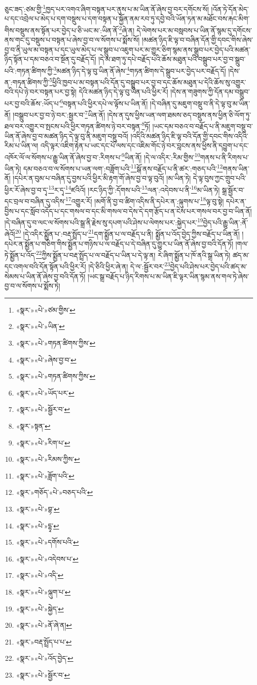 ཅུང་ཟད་:ཙམ་གྱི་\footnote{«སྣར་»«པེ་»ཙམ་གྱིས་}ཁྱད་པར་འགའ་ཞིག་བསྟན་པར་ནུས་པ་མ་ཡིན་ནོ་ཞེས་བྱ་བར་དགོངས་སོ། །འོན་ཏེ་དོན་མེད་པ་དང་འབྲེལ་པ་མེད་པ་དག་བསྡུས་པ་དག་བསྟན་པ་སྐྱོན་ནམ་རབ་ཏུ་དབྱེ་བའི་ཡོན་ཏན་མ་མཐོང་བས་རྐང་མིག་གིས་བསྡུས་ནས་སྟོན་པར་བྱེད་པ་ཅི་ཡང་མ་:ཡིན་ནོ་\footnote{«སྣར་»«པེ་»ཡིན་}ཞེ་ན། དེ་ལེགས་པར་མ་བསླབས་པ་ཡིན་ནོ་སྙམ་དུ་དགོངས་ནས་གང་དུ་བསྡུས་པ་བསྟན་པ་ཞེས་བྱ་བ་ལ་སོགས་པ་སྨོས་སོ། །མཚན་ཉིད་ཇི་ལྟ་བ་བཞིན་དོན་གྱི་དབང་གིས་ཞེས་བྱ་བ་ནི་ཡུལ་མ་བསྟན་པ་དང་ཡུལ་མེད་པ་ལ་སྒྲུབ་པ་འཇུག་པར་མ་གྱུར་ཅིག་སྙམ་ནས་སྒྲུབ་པར་བྱེད་པའི་མཚན་ཉིད་སྟོན་པ་དམ་བཅའ་བ་སྔོན་དུ་བརྗོད་དོ། །དེ་མ་ཐག་ཏུ་དཔེ་བརྗོད་པའི་ཆོས་མཐུན་པའི་བསྒྲུབ་པར་བྱ་བ་སྒྲུབ་པའི་:གཏན་ཚིགས་ཀྱི་\footnote{«སྣར་»«པེ་»གཏན་ཚིགས་ཀྱིས་}མཚན་ཉིད་དེ་ལྟ་བུ་ཡིན་ནོ་ཞེས་\footnote{«སྣར་»«པེ་»ཞེས་བྱ་བ་}གཏན་ཚིགས་དེ་སྒྲུབ་པར་བྱེད་པར་བརྗོད་དོ། །དེས་ན་:གཏན་ཚིགས་ཀྱི་\footnote{«སྣར་»«པེ་»གཏན་ཚིགས་ཀྱིས་}ཕྱིའི་ཁྱབ་པ་མ་བསྟན་པའི་དོན་དུ་བསྒྲུབ་པར་བྱ་བ་དང་ཆོས་མཐུན་པ་དེའི་ཆོས་སུ་འགྱུར་བའི་དཔེ་ཉེ་བར་བསྟན་པར་བྱ་སྟེ། དེའི་མཚན་ཉིད་དེ་ལྟ་བུ་ཡིན་པའི་ཕྱིར་རོ། །དེས་ན་གཟུགས་ཀྱི་དོན་དམ་བསྒྲུབ་པར་བྱ་བའི་ཆོས་:ཡོད་པ་\footnote{«སྣར་»«པེ་»ཡོད་པར་}བསྟན་པའི་ཕྱིར་དཔེ་ལ་ལྟོས་པ་ཡིན་ནོ། །དེ་བཞིན་དུ་མཇུག་བསྡུ་བ་ནི་དེ་ལྟ་བུ་མ་ཡིན་ནོ། །བསྒྲུབ་པར་བྱ་བ་ཉེ་བར་:སྦྱར་བ་\footnote{«སྣར་»«པེ་»སྦྱོར་བ་}ཡིན་ནོ། །དེས་ན་དུས་ཕྱིས་ཡན་ལག་ཐམས་ཅད་བསྡུས་ནས་ཕྱིན་ཅི་ལོག་ཏུ་ཐལ་བར་འགྱུར་བ་སྤངས་པའི་ཕྱིར་གཏན་ཚིགས་ཉེ་བར་བསྟན་\footnote{«སྣར་»སྟན་}ཏོ། །ཡང་དམ་བཅའ་བ་བརྗོད་པ་ནི་མཇུག་བསྡུ་བ་ཡིན་ནོ་ཞེས་བྱ་བ་མཚན་ཉིད་དེ་ལྟ་བུ་ནི་མཇུག་བསྡུ་བའོ། །འདིའི་མཚན་ཉིད་ཇི་ལྟ་བའི་དོན་གྱི་དབང་གིས་འདིའི་རིམ་པ་ཡིན་ལ། འདི་ལྟར་འཇིག་རྟེན་པ་ཡང་དང་པོ་ལས་དང་འཇིམ་གོང་ཉེ་བར་བླངས་ནས་ཕྱིས་ནི་དབྱུག་པ་དང་འཁོར་ལོ་ལ་སོགས་པ་རྒྱུ་ཡིན་ནོ་ཞེས་བྱ་བ་:རིགས་པ་\footnote{«སྣར་»«པེ་»རིག་པ་}ཡིན་ནོ། །དེ་ལ་འདིར་:རིམ་གྱིས་\footnote{«སྣར་»«པེ་»རིམས་ཀྱིས་}གནས་པ་ནི་རིགས་པ་ཡིན་ཏེ། དམ་བཅའ་བ་ལ་སོགས་པ་ཡན་ལག་:བཟློག་པའི་\footnote{«སྣར་»«པེ་»ཟློག་པའི་}སྒོ་ནས་བརྗོད་པ་ནི་ཚར་:གཅད་པའི་\footnote{«སྣར་»གཅོད་«པེ་»བཅད་པའི་}གནས་ཡིན་ནོ། །དཔེར་ན་བུམ་པ་བཞིན་དུ་བྱས་པའི་ཕྱིར་མི་རྟག་གོ་ཞེས་བྱ་བ་ལྟ་བུའོ། །མ་ཡིན་ཏེ། དེ་ལྟ་བུས་ཀྱང་གྲུབ་པའི་ཕྱིར་རོ་ཞེས་བྱ་བ་དྭ་\footnote{«སྣར་»«པེ་»བྷ་}ར་དྭ་\footnote{«སྣར་»«པེ་»དྷྭ་}ཛའིའོ། །རང་ཉིད་ཀྱི་:དོགས་པའི་\footnote{«སྣར་»«པེ་»དགོས་པའི་}ལན་:འདེབས་པ་ནི་\footnote{«སྣར་»«པེ་»འདེབས་པ་}མ་ཡིན་ཏེ། སྒྲ་སྦྱོར་བ་དང་བྲལ་བ་བཞིན་དུ་འདིས་\footnote{«སྣར་»«པེ་»འདི་}འགྱུར་རོ། །མགོ་ནི་བྱ་བ་ཚིག་འདིས་ནི་དཔེར་ན་:ལྐུགས་པ་\footnote{«སྣར་»«པེ་»ལྐུག་པ་}ལྟ་བུ་སྟེ། དཔེར་ན་བྱིས་པ་དང་སློབ་འདོད་པ་དང་གསལ་བ་དང་མི་གསལ་བ་དེས་དེ་དག་རྩོད་པ་ན་ངེས་པར་གསལ་བར་བྱ་བ་ཡིན་ནོ། །དེ་བཞིན་དུ་བ་ལང་ལ་སོགས་པའི་སྒྲ་ནི་རྗེས་སུ་དཔག་པའི་ཤེས་པ་ལེགས་པར་:སྐྱེད་པར་\footnote{«སྣར་»«པེ་»སྐྱེད་}བྱེད་པའི་རྒྱུ་ཡིན་:ནོ་ཞེའོ།\footnote{«སྣར་»«པེ་»ནོ་ཞེ་ན།} །དེ་འདིར་སྨྱོན་པ་:བརྡ་སྤྲོད་པ་\footnote{«སྣར་»བརྡ་སྤྲོད་པ་པ་}དག་སྨྱོན་པ་ལ་བརྗོད་པ་ནི། སྨྱོན་པ་འོད་བྱེད་ཀྱིས་བརྗོད་པ་ཡིན་ནོ། །དཔེར་ན་སྨྱོན་པ་གཅིག་གིས་སྨྱོན་པ་གཉིས་པ་ལ་བརྗོད་པ་དེ་བཞིན་དུ་གྱུར་པ་ཡིན་ནོ་ཞེས་བྱ་བའི་དོན་ཏོ། །གལ་ཏེ་སྨྱོན་པ་འོད་\footnote{«སྣར་»«པེ་»འོད་བྱེད་}ཀྱིས་སྨྱོན་པ་བརྡ་སྤྲོད་པ་ལ་བརྗོད་པ་ཡིན་པ་དེ་ལྟ་ན། རེ་ཞིག་སྨྱོན་པ་ཁོ་ནའི་སྒྲ་ཡིན་ཏེ། ཚད་མ་དང་འགལ་བའི་དོན་སྟོན་པའི་ཕྱིར་རོ། །དེ་ཅིའི་ཕྱིར་ཞེ་ན། དེ་ལ་:སྦྱོར་བར་\footnote{«སྣར་»«པེ་»སྦྱོར་བ་}བྱེད་པའི་ཤེས་པར་བྱེད་པའི་ཚད་མ་སེམས་པ་ཡིན་ནོ་ཞེས་བྱ་བའི་དོན་ཏོ། །ཡང་སྒྲ་བརྗོད་པ་ཉིད་རིགས་པ་མ་ཡིན་ཇི་ལྟར་ཡིན་སྙམ་ནས་གལ་ཏེ་ཞེས་བྱ་བ་ལ་སོགས་པ་སྨོས་ཏེ། 
